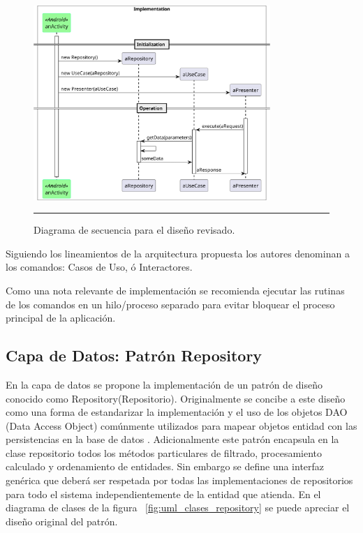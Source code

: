 \begin{figure}[htbp]
	\centering
	\includegraphics[width=0.8\textwidth]{Figures/design/SEQ_command_app.png}
	\rule{35em}{1pt}
	\caption[Commander Review]{Diagrama de secuencia para el diseño revisado.}
	\label{fig:uml_commander_sequence_req_resp}
\end{figure}

Siguiendo los lineamientos de la arquitectura propuesta los autores denominan a los comandos: Casos de Uso, ó Interactores.

Como una nota relevante de implementación se recomienda ejecutar las rutinas de los comandos en un hilo/proceso separado para evitar bloquear el proceso principal de la aplicación.

\subsection{Capa de Datos: Patrón Repository}
En la capa de datos se propone la implementación de un patrón de diseño conocido como Repository(Repositorio). 
Originalmente se concibe a este diseño como una forma de estandarizar la implementación y el uso de los objetos DAO (Data Access Object) comúnmente utilizados para mapear objetos entidad con las persistencias en la base de datos \cite{repo_wolf}.
Adicionalmente este patrón encapsula en la clase repositorio todos los métodos particulares de filtrado, procesamiento calculado y ordenamiento de entidades.
Sin embargo se define una interfaz genérica que deberá ser respetada por todas las implementaciones de repositorios para todo el sistema independientemente de la entidad que atienda.
En el diagrama de clases de la figura ~\ref{fig:uml_clases_repository} se puede apreciar el diseño original del patrón.

